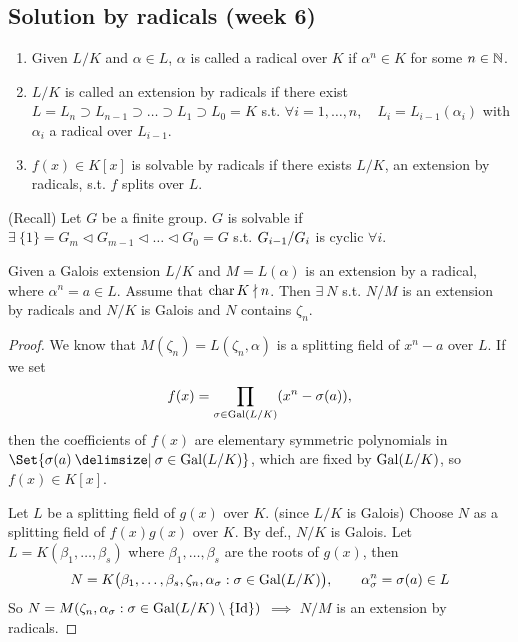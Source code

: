 \subsection{Solution by radicals (week 6)}

\begin{definition} \mbox{}
  \begin{enumerate}
    \item Given $L/K$ and $\alpha \in L$, $\alpha$ is called a radical over $K$
      if $\alpha^n \in K$ for some $n\in \mathbb{N}$.
    \item $L/K$ is called an extension by radicals if there exist
      $L = L_n \supset L_{n-1} \supset \dots \supset L_1 \supset L_0 = K$
      s.t. $\forall i = 1,\dots, n, \quad L_i = L_{i-1}(\alpha_i)$ with
      $\alpha_i$ a radical over $L_{i-1}$.
    \item $f(x) \in K[x]$ is solvable by radicals if there exists $L/K$,
      an extension by radicals, s.t. $f$ splits over $L$.
  \end{enumerate}
\end{definition}

\begin{definition}
  (Recall) Let $G$ be a finite group. $G$ is solvable if
  $\exists\: \{1\} = G_m \lhd G_{m-1} \lhd \dots \lhd G_0 = G$ s.t.
  ${G_{i-1}}/{G_i}$ is cyclic $\forall i$.
\end{definition}


\begin{lemma} \label{lemma:galois-radical-ext}
  Given a Galois extension $L/K$ and $M = L(\alpha)$ is an extension by
  a radical, where $\alpha^n = a \in L$. Assume that $\operatorname{char} K \nmid n$. Then
  $\exists\: N$ s.t. $N/M$ is an extension by radicals and $N/K$ is Galois
  and $N$ contains $\zeta_n$.
  \begin{proof}
    We know that $M(\zeta_n) = L(\zeta_n, \alpha)$ is a splitting field of
    $x^n - a$ over $L$. If we set
    \[ f(x) = \prod_{\sigma \in \operatorname{Gal}(L/K)} (x^n - \sigma(a)), \]
    then the coefficients of $f(x)$ are elementary symmetric polynomials in
    $\Set{\sigma(a) \given \sigma \in \Gal(L/K) }$, which are fixed by
    $\operatorname{Gal}(L/K)$, so $f(x) \in K[x]$.

    Let $L$ be a splitting field of $g(x)$ over $K$. (since $L/K$ is Galois)
    Choose $N$ as a splitting field of $f(x)g(x)$ over $K$.
    By def., $N/K$ is Galois. Let $L = K(\beta_1,\dots,\beta_s)$ where
    $\beta_1, \dots, \beta_s$ are the roots of $g(x)$, then
    \[
      N = K\big(\beta_1,\dots,\beta_s, \zeta_n,
        \alpha_\sigma : \sigma \in \operatorname{Gal}(L/K)
      \big),
      \qquad \alpha_\sigma^n = \sigma(a) \in L
    \]
    So $N = M(\zeta_n, \alpha_\sigma : \sigma \in \operatorname{Gal}(L/K) \setminus \{ {\rm Id} \})$
    $\implies$ $N/M$ is an extension by radicals.
  \end{proof}
\end{lemma}

